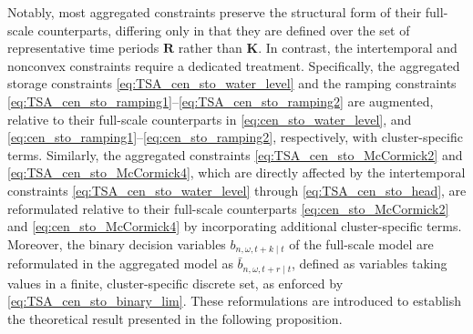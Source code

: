 \documentclass[a4paper,fleqn]{cas-sc}
\begin{document}
Notably, most aggregated constraints preserve the structural form of their full-scale counterparts,
differing only in that they are defined over the
set of representative time periods $\boldsymbol{R}$ rather than $\boldsymbol{K}$.
In contrast, the intertemporal and nonconvex constraints require a dedicated treatment.
Specifically, the aggregated storage constraints \eqref{eq:TSA_cen_sto_water_level} and the ramping constraints \eqref{eq:TSA_cen_sto_ramping1}--\eqref{eq:TSA_cen_sto_ramping2} are augmented,
relative to their full-scale counterparts in \eqref{eq:cen_sto_water_level}, and \eqref{eq:cen_sto_ramping1}--\eqref{eq:cen_sto_ramping2}, respectively,
with cluster-specific terms.
Similarly, the aggregated constraints \eqref{eq:TSA_cen_sto_McCormick2} and \eqref{eq:TSA_cen_sto_McCormick4},
which are directly affected by the intertemporal constraints \eqref{eq:TSA_cen_sto_water_level} through \eqref{eq:TSA_cen_sto_head},
are reformulated relative to their full-scale counterparts \eqref{eq:cen_sto_McCormick2} and \eqref{eq:cen_sto_McCormick4} by incorporating additional cluster-specific terms.
Moreover, the binary decision variables $b_{n,\omega,t+k\mid t}$ of the full-scale model are reformulated in the aggregated model as $\bar{b}_{n,\omega,t+r\mid t}$,
defined as variables taking values in a finite, cluster-specific discrete set, as enforced by \eqref{eq:TSA_cen_sto_binary_lim}.
These reformulations are introduced to establish the theoretical result presented in the following proposition.
\end{document}
